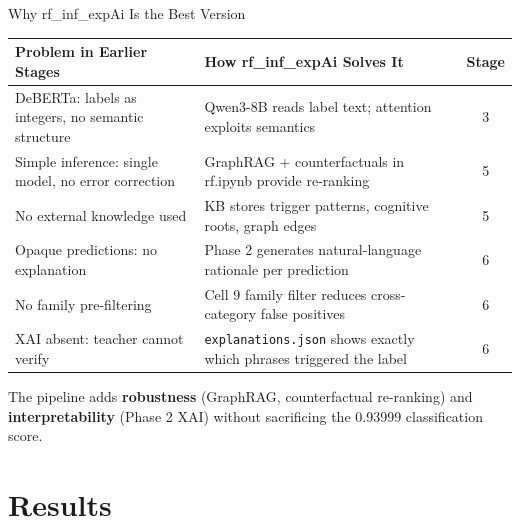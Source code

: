 ﻿\documentclass[aspectratio=169,10pt]{beamer}
\begin{document}
\begin{frame}[shrink=4]{Why rf\_inf\_expAi Is the Best Version}
\small
\setlength{\tabcolsep}{4pt}
\renewcommand{\arraystretch}{1.3}
\begin{center}
\begin{tabular}{p{4.2cm}p{5.5cm}c}
\toprule
\textbf{Problem in Earlier Stages} & \textbf{How rf\_inf\_expAi Solves It} & \textbf{Stage}\\
\midrule
\rowcolor{RowTintA}
DeBERTa: labels as integers, no semantic structure & Qwen3-8B reads label text; attention exploits semantics & 3\\
\rowcolor{RowTintB}
Simple inference: single model, no error correction & GraphRAG + counterfactuals in rf.ipynb provide re-ranking & 5\\
\rowcolor{RowTintA}
No external knowledge used & KB stores trigger patterns, cognitive roots, graph edges & 5\\
\rowcolor{RowTintB}
Opaque predictions: no explanation & Phase 2 generates natural-language rationale per prediction & 6\\
\rowcolor{RowTintA}
No family pre-filtering & Cell 9 family filter reduces cross-category false positives & 6\\
\rowcolor{RowTintB}
XAI absent: teacher cannot verify & \texttt{explanations.json} shows exactly which phrases triggered the label & 6\\
\bottomrule
\end{tabular}
\end{center}
\vspace{6pt}
\begin{center}
\begin{block}{}
\centering
The pipeline adds \textbf{robustness} (GraphRAG, counterfactual re-ranking) and \textbf{interpretability} (Phase 2 XAI) without sacrificing the 0.93999 classification score.
\end{block}
\end{center}
\end{frame}

\section{Results}
\end{document}

